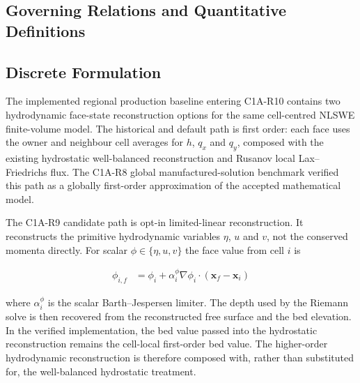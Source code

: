\subsection{Governing Relations and Quantitative Definitions}
\label{sec:res-num-flx-governing-relations}

%

\subsection{Discrete Formulation}
\label{sec:res-num-flx-discrete-formulation}

The implemented regional production baseline entering C1A-R10 contains
two hydrodynamic face-state reconstruction options for the same
cell-centred NLSWE finite-volume model. The historical and default path
is first order: each face uses the owner and neighbour cell averages for
$h$, $q_x$ and $q_y$, composed with the existing hydrostatic
well-balanced reconstruction and Rusanov local Lax--Friedrichs flux. The
C1A-R8 global manufactured-solution benchmark verified this path as a
globally first-order approximation of the accepted mathematical model.

The C1A-R9 candidate path is opt-in limited-linear reconstruction. It
reconstructs the primitive hydrodynamic variables
$\eta$, $u$ and $v$, not the conserved momenta directly. For scalar
$\phi\in\{\eta,u,v\}$ the face value from cell $i$ is

\begin{align}
  \phi_{i,f}
  &=
  \phi_i
  +
  \alpha_i^{\phi}
  \nabla\phi_i
  \cdot
  \left(
    \mathbf{x}_f-\mathbf{x}_i
  \right)
  \label{eq:res-num-flx-r9-face-reconstruction}
\end{align}

where $\alpha_i^{\phi}$ is the scalar Barth--Jespersen limiter. The
depth used by the Riemann solve is then recovered from the reconstructed
free surface and the bed elevation. In the verified implementation, the
bed value passed into the hydrostatic reconstruction remains the
cell-local first-order bed value. The higher-order hydrodynamic
reconstruction is therefore composed with, rather than substituted for,
the well-balanced hydrostatic treatment.

